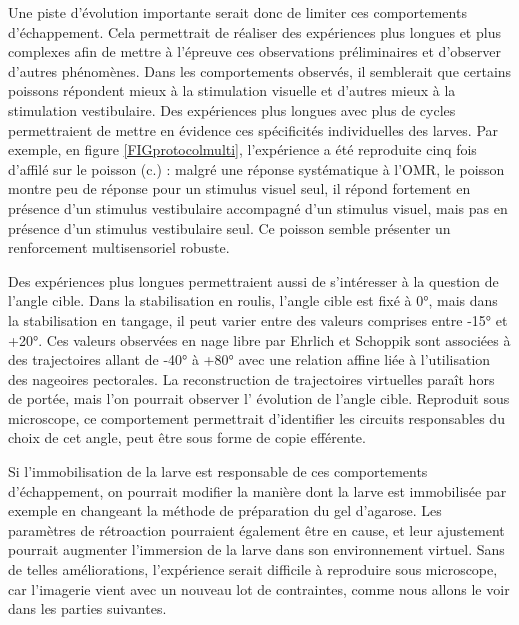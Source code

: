 Une piste d'évolution importante serait donc de limiter ces comportements d'échappement. Cela permettrait de réaliser des expériences plus longues et plus complexes afin de mettre à l'épreuve ces observations préliminaires et d'observer d'autres phénomènes.
Dans les comportements observés, il semblerait que certains poissons répondent mieux à la stimulation visuelle et d'autres mieux à la stimulation vestibulaire. Des expériences plus longues avec plus de cycles permettraient de mettre en évidence ces spécificités individuelles des larves. Par exemple, en figure \ref{FIGprotocolmulti}, l'expérience a été reproduite cinq fois d'affilé sur le poisson (c.) : malgré une réponse systématique à l'OMR, le poisson montre peu de réponse pour un stimulus visuel seul, il répond fortement en présence d'un stimulus vestibulaire accompagné d'un stimulus visuel, mais pas en présence d'un stimulus vestibulaire seul. Ce poisson semble présenter un renforcement multisensoriel robuste.

Des expériences plus longues permettraient aussi de s'intéresser à la question de l'angle cible. Dans la stabilisation en roulis, l'angle cible est fixé à 0°, mais dans la stabilisation en tangage, il peut varier entre des valeurs comprises entre -15° et +20°. Ces valeurs observées en nage libre par Ehrlich et Schoppik \cite{ehrlich_primal_2019} sont associées à des trajectoires allant de -40° à +80° avec une relation affine liée à l'utilisation des nageoires pectorales. La reconstruction de trajectoires virtuelles paraît hors de portée, mais l'on pourrait observer l' évolution de l'angle cible. Reproduit sous microscope, ce comportement permettrait d'identifier les circuits responsables du choix de cet angle, peut être sous forme de copie efférente.

Si l'immobilisation de la larve est responsable de ces comportements d'échappement, on pourrait modifier la manière dont la larve est immobilisée par exemple en changeant la méthode de préparation du gel d'agarose. Les paramètres de rétroaction pourraient également être en cause, et leur ajustement pourrait augmenter l'immersion de la larve dans son environnement virtuel. Sans de telles améliorations, l'expérience serait difficile à reproduire sous microscope, car l'imagerie vient avec un nouveau lot de contraintes, comme nous allons le voir dans les parties suivantes.


